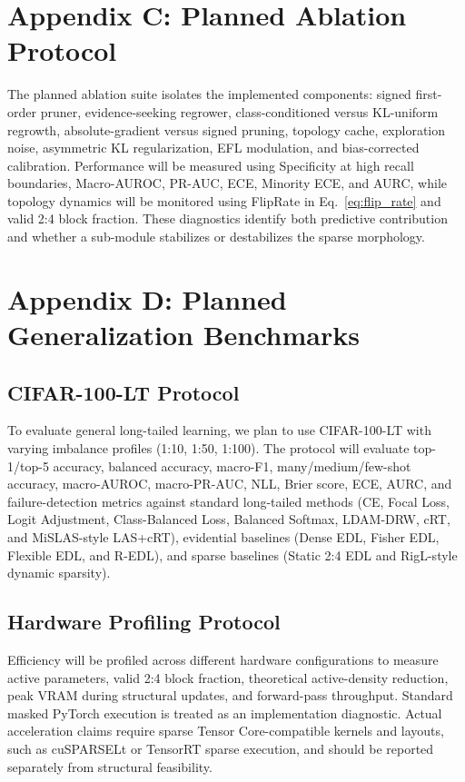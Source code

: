 \documentclass[letterpaper]{article} %
\begin{document}
\section{Appendix C: Planned Ablation Protocol}
The planned ablation suite isolates the implemented components: signed first-order pruner, evidence-seeking regrower, class-conditioned versus KL-uniform regrowth, absolute-gradient versus signed pruning, topology cache, exploration noise, asymmetric KL regularization, EFL modulation, and bias-corrected calibration. Performance will be measured using Specificity at high recall boundaries, Macro-AUROC, PR-AUC, ECE, Minority ECE, and AURC, while topology dynamics will be monitored using FlipRate in Eq.~\ref{eq:flip_rate} and valid 2:4 block fraction. These diagnostics identify both predictive contribution and whether a sub-module stabilizes or destabilizes the sparse morphology.

\section{Appendix D: Planned Generalization Benchmarks}

\subsection{CIFAR-100-LT Protocol}
To evaluate general long-tailed learning, we plan to use CIFAR-100-LT with varying imbalance profiles (1:10, 1:50, 1:100). The protocol will evaluate top-1/top-5 accuracy, balanced accuracy, macro-F1, many/medium/few-shot accuracy, macro-AUROC, macro-PR-AUC, NLL, Brier score, ECE, AURC, and failure-detection metrics against standard long-tailed methods (CE, Focal Loss, Logit Adjustment, Class-Balanced Loss, Balanced Softmax, LDAM-DRW, cRT, and MiSLAS-style LAS+cRT), evidential baselines (Dense EDL, Fisher EDL, Flexible EDL, and R-EDL), and sparse baselines (Static 2:4 EDL and RigL-style dynamic sparsity).

\subsection{Hardware Profiling Protocol}
Efficiency will be profiled across different hardware configurations to measure active parameters, valid 2:4 block fraction, theoretical active-density reduction, peak VRAM during structural updates, and forward-pass throughput. Standard masked PyTorch execution is treated as an implementation diagnostic. Actual acceleration claims require sparse Tensor Core-compatible kernels and layouts, such as cuSPARSELt or TensorRT sparse execution, and should be reported separately from structural feasibility.
\end{document}

